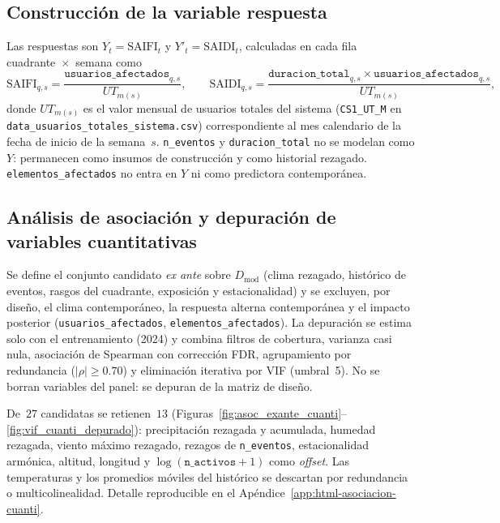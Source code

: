 \subsection{Construcción de la variable respuesta}
Las respuestas son $Y_t=\mathrm{SAIFI}_t$ y $Y'_t=\mathrm{SAIDI}_t$, calculadas en cada fila cuadrante~$\times$~semana como
\begin{equation}
\mathrm{SAIFI}_{q,s}=\dfrac{\texttt{usuarios\_afectados}_{q,s}}{UT_{m(s)}},
\qquad
\mathrm{SAIDI}_{q,s}=\dfrac{\texttt{duracion\_total}_{q,s}\times\texttt{usuarios\_afectados}_{q,s}}{UT_{m(s)}},
\end{equation}
donde $UT_{m(s)}$ es el valor mensual de usuarios totales del sistema (\texttt{CS1\_UT\_M} en \texttt{data\_usuarios\_totales\_sistema.csv}) correspondiente al mes calendario de la fecha de inicio de la semana~$s$. \texttt{n\_eventos} y \texttt{duracion\_total} no se modelan como $Y$: permanecen como insumos de construcción y como historial rezagado. \texttt{elementos\_afectados} no entra en $Y$ ni como predictora contemporánea.

\subsection{Análisis de asociación y depuración de variables cuantitativas}
\label{sec:asociacion_depuracion_cuanti}
Se define el conjunto candidato \emph{ex ante} sobre $D_{\mathrm{mod}}$ (clima rezagado, histórico de eventos, rasgos del cuadrante, exposición y estacionalidad) y se excluyen, por diseño, el clima contemporáneo, la respuesta alterna contemporánea y el impacto posterior (\texttt{usuarios\_afectados}, \texttt{elementos\_afectados}). La depuración se estima solo con el entrenamiento (2024) y combina filtros de cobertura, varianza casi nula, asociación de Spearman con corrección FDR, agrupamiento por redundancia ($|\rho|\geq 0{.}70$) y eliminación iterativa por VIF (umbral~5). No se borran variables del panel: se depuran de la matriz de diseño.

De~$27$ candidatas se retienen~$13$ (Figuras~\ref{fig:asoc_exante_cuanti}--\ref{fig:vif_cuanti_depurado}): precipitación rezagada y acumulada, humedad rezagada, viento máximo rezagado, rezagos de \texttt{n\_eventos}, estacionalidad armónica, altitud, longitud y $\log(\texttt{n\_activos}+1)$ como \emph{offset}. Las temperaturas y los promedios móviles del histórico se descartan por redundancia o multicolinealidad. Detalle reproducible en el Apéndice~\ref{app:html-asociacion-cuanti}.

